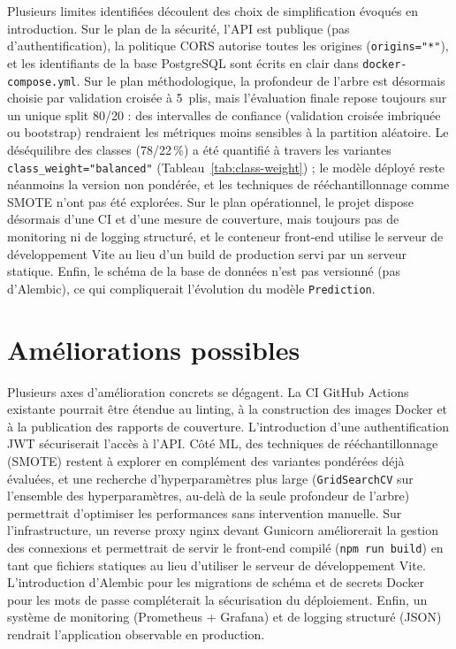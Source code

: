 \documentclass[12pt,a4paper,openany]{report}
\newcommand{\file}[1]{\texttt{#1}}
\begin{document}
Plusieurs limites identifiées découlent des choix de simplification évoqués en introduction. Sur le plan de la sécurité, l'API est publique (pas d'authentification), la politique CORS autorise toutes les origines (\texttt{origins="*"}), et les identifiants de la base PostgreSQL sont écrits en clair dans \file{docker-compose.yml}. Sur le plan méthodologique, la profondeur de l'arbre est désormais choisie par validation croisée à 5~plis, mais l'évaluation finale repose toujours sur un unique split 80/20 : des intervalles de confiance (validation croisée imbriquée ou bootstrap) rendraient les métriques moins sensibles à la partition aléatoire. Le déséquilibre des classes (78/22\,\%) a été quantifié à travers les variantes \texttt{class\_weight="balanced"} (Tableau~\ref{tab:class-weight}) ; le modèle déployé reste néanmoins la version non pondérée, et les techniques de rééchantillonnage comme SMOTE n'ont pas été explorées. Sur le plan opérationnel, le projet dispose désormais d'une CI et d'une mesure de couverture, mais toujours pas de monitoring ni de logging structuré, et le conteneur front-end utilise le serveur de développement Vite au lieu d'un build de production servi par un serveur statique. Enfin, le schéma de la base de données n'est pas versionné (pas d'Alembic), ce qui compliquerait l'évolution du modèle \texttt{Prediction}.

\section{Améliorations possibles}

Plusieurs axes d'amélioration concrets se dégagent. La CI GitHub Actions existante pourrait être étendue au linting, à la construction des images Docker et à la publication des rapports de couverture. L'introduction d'une authentification JWT sécuriserait l'accès à l'API. Côté ML, des techniques de rééchantillonnage (SMOTE) restent à explorer en complément des variantes pondérées déjà évaluées, et une recherche d'hyperparamètres plus large (\texttt{GridSearchCV} sur l'ensemble des hyperparamètres, au-delà de la seule profondeur de l'arbre) permettrait d'optimiser les performances sans intervention manuelle. Sur l'infrastructure, un reverse proxy nginx devant Gunicorn améliorerait la gestion des connexions et permettrait de servir le front-end compilé (\texttt{npm run build}) en tant que fichiers statiques au lieu d'utiliser le serveur de développement Vite. L'introduction d'Alembic pour les migrations de schéma et de secrets Docker pour les mots de passe compléterait la sécurisation du déploiement. Enfin, un système de monitoring (Prometheus + Grafana) et de logging structuré (JSON) rendrait l'application observable en production.
\end{document}
